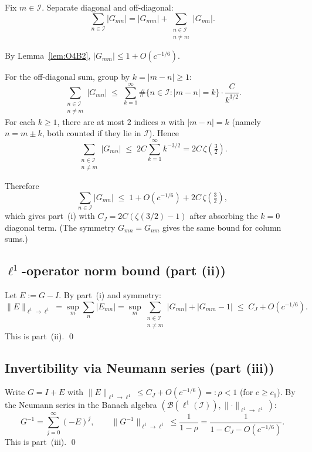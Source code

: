 \documentclass[12pt,a4paper]{amsart}
\theoremstyle{definition}
\newcommand{\CJ}{C_J}
\newcommand{\normone}[1]{\lVert #1 \rVert_{\ell^1\to\ell^1}}
\newcommand{\abs}[1]{\lvert #1 \rvert}
\begin{document}
Fix $m \in \mathcal{I}$. Separate diagonal and off-diagonal:
\[
  \sum_{n \in \mathcal{I}} \abs{G_{mn}}
  = \abs{G_{mm}} + \sum_{\substack{n \in \mathcal{I}\\ n \ne m}} \abs{G_{mn}}.
\]

By Lemma~\ref{lem:O4B2}, $\abs{G_{mm}} \le 1 + O(c^{-1/6})$.

For the off-diagonal sum, group by $k = \abs{m-n} \ge 1$:
\[
  \sum_{\substack{n \in \mathcal{I}\\ n \ne m}} \abs{G_{mn}}
  \;\le\; \sum_{k=1}^{\infty} \#\{n \in \mathcal{I} : \abs{m-n} = k\}
          \cdot \frac{C}{k^{3/2}}.
\]
For each $k \ge 1$, there are at most $2$ indices $n$ with $\abs{m-n}=k$
(namely $n = m \pm k$, both counted if they lie in $\mathcal{I}$).
Hence
\begin{equation}
  \sum_{\substack{n \in \mathcal{I}\\ n \ne m}} \abs{G_{mn}}
  \;\le\; 2C \sum_{k=1}^{\infty} k^{-3/2}
  = 2C\,\zeta\!\left(\tfrac{3}{2}\right).
  \label{eq:schur_raw}
\end{equation}

Therefore
\[
  \sum_{n \in \mathcal{I}} \abs{G_{mn}}
  \;\le\; 1 + O(c^{-1/6}) + 2C\,\zeta\!\left(\tfrac{3}{2}\right),
\]
which gives part~(i) with $\CJ = 2C(\zeta(3/2)-1)$ after
absorbing the $k=0$ diagonal term. (The symmetry $G_{mn}=G_{nm}$
gives the same bound for column sums.)

\subsection{$\ell^1$-operator norm bound (part (ii))}

Let $E := G - I$. By part~(i) and symmetry:
\[
  \normone{E}
  = \sup_m \sum_n \abs{E_{mn}}
  = \sup_m \sum_{\substack{n \in \mathcal{I}\\ n \ne m}} \abs{G_{mn}}
    + \abs{G_{mm}-1}
  \;\le\; \CJ + O(c^{-1/6}).
\]
This is part~(ii). \qed

\subsection{Invertibility via Neumann series (part (iii))}

Write $G = I + E$ with $\normone{E} \le \CJ + O(c^{-1/6}) =: \rho < 1$
(for $c \ge c_1$). By the Neumann series in the Banach algebra
$(\mathcal{B}(\ell^1(\mathcal{I})), \normone{\cdot})$:
\[
  G^{-1} = \sum_{j=0}^{\infty} (-E)^j,
  \qquad
  \normone{G^{-1}} \le \frac{1}{1-\rho} = \frac{1}{1-\CJ-O(c^{-1/6})}.
\]
This is part~(iii). \qed
\end{document}
